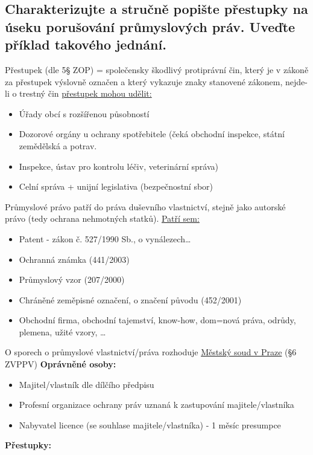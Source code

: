 \subsection{Charakterizujte a stručně popište přestupky na úseku porušování průmyslových práv. Uveďte příklad takového jednání.}
Přestupek (dle 5§ ZOP) = společensky škodlivý protiprávní čin, který je v zákoně za přestupek výslovně označen
a který vykazuje znaky stanovené zákonem, nejde-li o trestný čin
\underline{přestupek mohou udělit:}
\begin{itemize}
    \item Úřady obcí s rozšířenou působností
    \item Dozorové orgány u ochrany spotřebitele (čeká obchodní inspekce, státní zemědělská a potrav.
    \item Inspekce, ústav pro kontrolu léčiv, veterinární správa)
    \item Celní správa + unijní legislativa (bezpečnostní sbor)
\end{itemize}
Průmyslové právo patří do práva duševního vlastnictví, stejně jako autorské právo (tedy ochrana nehmotných
statků).
\underline{Patří sem:}
\begin{itemize}
    \item Patent - zákon č. 527/1990 Sb., o vynálezech…
    \item Ochranná známka (441/2003)
    \item Průmyslový vzor (207/2000)
    \item Chráněné zeměpisné označení, o značení původu (452/2001)
    \item Obchodní firma, obchodní tajemství, know-how, dom=nová práva, odrůdy, plemena, užité vzory, …
\end{itemize}
O sporech o průmyslové vlastnictví/práva rozhoduje \underline{Městský soud v Praze} (§6 ZVPPV)
\textbf{Oprávněné osoby:}
\begin{itemize}
    \item Majitel/vlastník dle dílčího předpisu
    \item Profesní organizace ochrany práv uznaná k zastupování majitele/vlastníka
    \item Nabyvatel licence (se souhlase majitele/vlastníka) - 1 měsíc presumpce
\end{itemize}
\textbf{Přestupky:}
